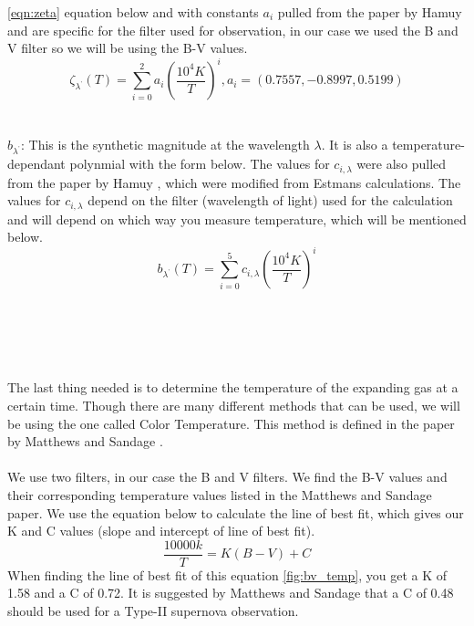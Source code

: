 \ref{eqn:zeta} equation below and with constants $a_i$ pulled from the paper by Hamuy \cite{hamuy_distance_2001}
and are specific for the filter used for observation, in our case we used the B and V filter so we will be using the B-V values.
\begin{equation}\label{eqn:zeta}
    \zeta_{\lambda^{\textrm{'}}}(T) = \sum_{i=0}^{2}a_i(\frac{10^4K}{T})^i
    , a_i = (0.7557, -0.8997, 0.5199)
\end{equation}
\\
\\
$b_{\lambda^{\textrm{'}}}$: This is the synthetic magnitude at the wavelength $\lambda$. It is also a 
temperature-dependant polynmial with the form below. The values for $c_{i,\lambda}$ were also pulled from the paper
by Hamuy \cite{hamuy_distance_2001}, which were modified from Estmans \cite{eastman_atmospheres_1996} calculations.
The values for $c_{i,\lambda}$ depend on the filter (wavelength of light) used for the calculation and will depend on
which way you measure temperature, which will be mentioned below.
\begin{equation}\label{eqn:synth_mag}
    b_{\lambda^{\textrm{'}}}(T) = \sum_{i=0}^{5}c_{i,\lambda}(\frac{10^4K}{T})^i
\end{equation}
\\
\\
\\
\\
\\
The last thing needed is to determine the temperature of the expanding gas at a certain time. Though there are many different methods
that can be used, we will be using the one called Color Temperature. This method is defined in the paper by Matthews and Sandage \cite{matthews_optical_1963}.
\\
\\
We use two filters, in our case the B and V filters. We find the B-V values and their corresponding temperature values listed in the 
Matthews and Sandage \cite{matthews_optical_1963} paper. We use the equation below to calculate the line of best fit, which gives 
our K and C values (slope and intercept of line of best fit).
\begin{equation}\label{eqn:kandc}
    \frac{10000k}{T} = K(B-V)+C
\end{equation}
When finding the line of best fit of this equation \ref{fig:bv_temp}, you get a K of 1.58 and a C of 0.72. 
It is suggested by Matthews and Sandage \cite{matthews_optical_1963}
that a C of 0.48 should be used for a Type-II supernova observation.
